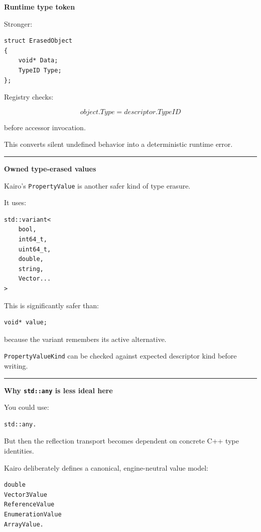 \textbf{Runtime type token}

Stronger:

\begin{verbatim}
struct ErasedObject
{
    void* Data;
    TypeID Type;
};
\end{verbatim}

Registry checks:

\[
object.Type=
descriptor.TypeID
\]

before accessor invocation.

This converts silent undefined behavior into a deterministic runtime error.

\begin{center}\rule{0.5\linewidth}{0.5pt}\end{center}

\textbf{Owned type-erased values}

Kairo's \texttt{PropertyValue} is another safer kind of type erasure.

It uses:

\begin{verbatim}
std::variant<
    bool,
    int64_t,
    uint64_t,
    double,
    string,
    Vector...
>
\end{verbatim}

This is significantly safer than:

\begin{verbatim}
void* value;
\end{verbatim}

because the variant remembers its active alternative.

\texttt{PropertyValueKind} can be checked against expected descriptor kind before writing.

\begin{center}\rule{0.5\linewidth}{0.5pt}\end{center}

\textbf{Why \texttt{std::any} is less ideal here}

You could use:

\begin{verbatim}
std::any.
\end{verbatim}

But then the reflection transport becomes dependent on concrete C++ type identities.

Kairo deliberately defines a canonical, engine-neutral value model:

\begin{verbatim}
double
Vector3Value
ReferenceValue
EnumerationValue
ArrayValue.
\end{verbatim}

